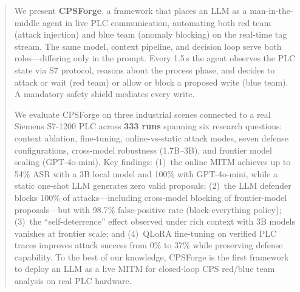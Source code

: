 \begin{abstract}
We present \textbf{CPSForge}, a framework that places an LLM as a man-in-the-middle agent in live PLC communication, automating both red team (attack injection) and blue team (anomaly blocking) on the real-time tag stream. The same model, context pipeline, and decision loop serve both roles---differing only in the prompt. Every 1.5\,s the agent observes the PLC state via S7 protocol, reasons about the process phase, and decides to attack or wait (red team) or allow or block a proposed write (blue team). A mandatory safety shield mediates every write.

We evaluate CPSForge on three industrial scenes connected to a real Siemens S7-1200 PLC across \textbf{333 runs} spanning six research questions: context ablation, fine-tuning, online-vs-static attack modes, seven defense configurations, cross-model robustness (1.7B--3B), and frontier model scaling (GPT-4o-mini). Key findings: (1)~the online MITM achieves up to 54\% ASR with a 3B local model and 100\% with GPT-4o-mini, while a static one-shot LLM generates zero valid proposals; (2)~the LLM defender blocks 100\% of attacks---including cross-model blocking of frontier-model proposals---but with 98.7\% false-positive rate (block-everything policy); (3)~the ``self-deterrence'' effect observed under rich context with 3B models vanishes at frontier scale; and (4)~QLoRA fine-tuning on verified PLC traces improves attack success from 0\% to 37\% while preserving defense capability. To the best of our knowledge, CPSForge is the first framework to deploy an LLM as a live MITM for closed-loop CPS red/blue team analysis on real PLC hardware.
\end{abstract}
